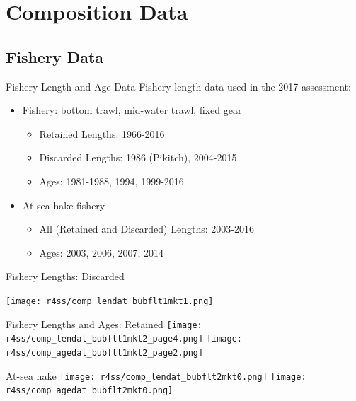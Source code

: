 \documentclass[pdf]{beamer}\usepackage[]{graphicx}\usepackage[]{color}
\begin{document}
\section{Composition Data}
\subsection{Fishery Data}
\begin{frame}{Fishery Length and Age Data}
  Fishery length data used in the 2017 assessment:
  \begin{itemize}
    \item Fishery: bottom trawl, mid-water trawl, fixed gear
      \begin{itemize}
        \item Retained Lengths: 1966-2016
        \item Discarded Lengths: 1986 (Pikitch), 2004-2015
        \item Ages: 1981-1988, 1994, 1999-2016
      \end{itemize}
    \item At-sea hake fishery
      \begin{itemize}
        \item All (Retained and Discarded) Lengths: 2003-2016
        \item Ages: 2003, 2006, 2007, 2014
      \end{itemize}
  \end{itemize}
\end{frame}

\begin{frame}{Fishery Lengths: Discarded}
   \begin{center}
   \texttt{[image: r4ss/comp\_lendat\_bubflt1mkt1.png]}
   \end{center}
\end{frame}

\begin{frame}{Fishery Lengths and Ages: Retained}
   \texttt{[image: r4ss/comp\_lendat\_bubflt1mkt2\_page4.png]}
   \texttt{[image: r4ss/comp\_agedat\_bubflt1mkt2\_page2.png]}
\end{frame}


\begin{frame}{At-sea hake}
  \texttt{[image: r4ss/comp\_lendat\_bubflt2mkt0.png]}
  \texttt{[image: r4ss/comp\_agedat\_bubflt2mkt0.png]}
\end{frame}
\end{document}
